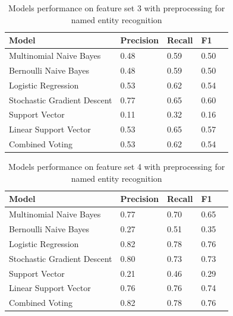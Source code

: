 \documentclass[11pt,oneside]{book}
\begin{document}
\begin{longtable}{|l|l|l|l|l|}
\caption{Models performance on feature set 3 with preprocessing for named entity recognition}
\label{tab:ner_feature_set_3}\\
\hline
\textbf{Model}          & \multicolumn{1}{c|}{\textbf{Precision}} & \multicolumn{1}{c|}{\textbf{Recall}} & \textbf{F1} \\ \hline
\endfirsthead
%
\endhead
%
Multinomial Naive Bayes &  0.48  & 0.59  & 0.50   \\ \hline
Bernoulli Naive Bayes       & 0.48 & 0.59 & 0.50   \\ \hline
Logistic Regression         & 0.53 & 0.62 & 0.54  \\ \hline
Stochastic Gradient Descent & 0.77 & 0.65 & 0.60  \\ \hline
Support Vector              &  0.11 & 0.32 & 0.16  \\ \hline
Linear Support Vector       & 0.53 & 0.65 & 0.57  \\ \hline
Combined Voting             & 0.53 & 0.62 & 0.54   \\ \hline
\end{longtable}

\begin{longtable}{|l|l|l|l|l|}
\caption{Models performance on feature set 4 with preprocessing for named entity recognition}
\label{tab:ner_feature_set_4}\\
\hline
\textbf{Model}          & \multicolumn{1}{c|}{\textbf{Precision}} & \multicolumn{1}{c|}{\textbf{Recall}} & \textbf{F1} \\ \hline
\endfirsthead
%
\endhead
%
Multinomial Naive Bayes &  0.77  & 0.70  & 0.65  \\ \hline
Bernoulli Naive Bayes       & 0.27 & 0.51 & 0.35   \\ \hline
Logistic Regression         & 0.82 & 0.78 & 0.76   \\ \hline
Stochastic Gradient Descent & 0.80 & 0.73 & 0.73   \\ \hline
Support Vector              & 0.21 & 0.46 & 0.29   \\ \hline
Linear Support Vector       & 0.76 & 0.76 & 0.74   \\ \hline
Combined Voting             & 0.82 & 0.78 & 0.76   \\ \hline
\end{longtable}
\end{document}

